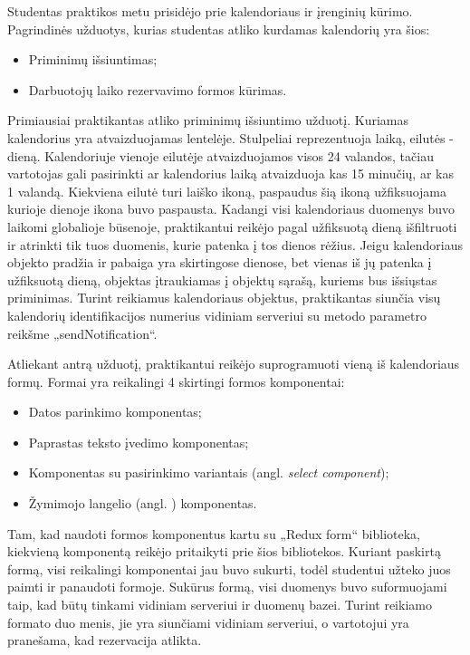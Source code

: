 \documentclass{VUMIFPSbakalaurinis}
\begin{document}
Studentas praktikos metu prisidėjo prie kalendoriaus ir įrenginių kūrimo. Pagrindinės užduotys, kurias studentas atliko kurdamas kalendorių yra šios: 
\begin{itemize}
    \item Priminimų išsiuntimas;
    \item Darbuotojų laiko rezervavimo formos kūrimas.
\end{itemize}

Primiausiai praktikantas atliko priminimų išsiuntimo užduotį. Kuriamas kalendorius yra atvaizduojamas lentelėje. Stulpeliai reprezentuoja laiką, eilutės - dieną. Kalendoriuje vienoje eilutėje atvaizduojamos visos 24 valandos, tačiau vartotojas gali pasirinkti ar kalendorius laiką atvaizduoja kas 15 minučių, ar kas 1 valandą. Kiekviena eilutė turi laiško ikoną, paspaudus šią ikoną užfiksuojama kurioje dienoje ikona buvo paspausta. Kadangi visi kalendoriaus duomenys buvo laikomi globalioje būsenoje, praktikantui reikėjo pagal užfiksuotą dieną išfiltruoti ir atrinkti tik tuos duomenis, kurie patenka į tos dienos rėžius. Jeigu kalendoriaus objekto pradžia ir pabaiga yra skirtingose dienose, bet vienas iš jų patenka į užfiksuotą dieną, objektas įtraukiamas į objektų sąrašą, kuriems bus išsiųstas priminimas. Turint reikiamus kalendoriaus objektus, praktikantas siunčia visų kalendorių identifikacijos numerius vidiniam serveriui su metodo parametro reikšme „sendNotification“.

Atliekant antrą užduotį, praktikantui reikėjo suprogramuoti vieną iš kalendoriaus formų. Formai yra reikalingi 4 skirtingi formos komponentai:
\begin{itemize}
    \item Datos parinkimo komponentas;
    \item Paprastas teksto įvedimo komponentas;
    \item Komponentas su pasirinkimo variantais (angl. \textit{select component});
    \item Žymimojo langelio (angl. ) komponentas.
\end{itemize} 
Tam, kad naudoti formos komponentus kartu su „Redux form“ biblioteka, kiekvieną komponentą reikėjo pritaikyti prie šios bibliotekos. Kuriant paskirtą formą, visi reikalingi komponentai jau buvo sukurti, todėl studentui užteko juos paimti ir panaudoti formoje. Sukūrus formą, visi duomenys buvo suformuojami taip, kad būtų tinkami vidiniam serveriui ir duomenų bazei. Turint reikiamo formato duo menis, jie yra siunčiami vidiniam serveriui, o vartotojui yra pranešama, kad rezervacija atlikta.
\end{document}

